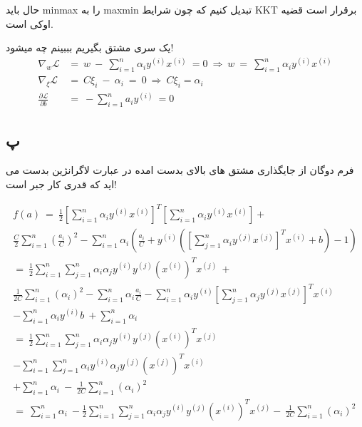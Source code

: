 \documentclass{article}[12pt]
\begin{document}
حال باید minmax را به maxmin تبدیل کنیم که چون شرایط KKT برقرار است قضیه اوکی است.



یک سری مشتق بگیریم بببینم چه میشود!
\begin{equation*}
\begin{split}
\nabla _{w}\mathcal{L} &=\ w\ -\ \sum _{i=1}^{n} \alpha _{i} y^{( i)} x^{( i)} \ =0\ \Rightarrow \ w\ =\ \sum _{i=1}^{n} \alpha _{i} y^{( i)} x^{( i)}\\
\nabla _{\xi }\mathcal{L} \ &=\ C\xi _{i} \ -\ \alpha _{i} \ =\ 0\ \Rightarrow \ C\xi _{i} =\alpha _{i}\\
\frac{\partial \mathcal{L}}{\partial b} &=\ -\sum _{i=1}^{n} a_{i} y^{( i)} \ =0
\end{split}
\end{equation*}
\clearpage
\subsection{پ}
فرم دوگان از جایگذاری
مشتق های بالای بدست امده در 
 عبارت لاگرانژین 
بدست می اید که قدری کار جبر است! 

\begin{gather*}
f( a) \ =\ \frac{1}{2}\left[\sum _{i=1}^{n} \alpha _{i} y^{( i)} x^{( i)}\right]^{T}\left[\sum _{i=1}^{n} \alpha _{i} y^{( i)} x^{( i)}\right] +\\
\frac{C}{2}\sum _{i=1}^{n}\left(\frac{a_{i}}{C}\right)^{2} -\sum _{i=1}^{n} \alpha _{i}\left(\frac{a_{i}}{C} +y^{( i)}\left(\left[\sum _{j=1}^{n} \alpha _{i} y^{( j)} x^{( j)}\right]^{T} x^{( i)} +b\right) -1\right)\\
=\ \frac{1}{2}\sum _{i=1}^{n}\sum _{j=1}^{n} \alpha _{i} \alpha _{j} y^{( i)} y^{( j)}\left( x^{( i)}\right)^{T} x^{( j)} \ +\\
\frac{1}{2C}\sum _{i=1}^{n}( \alpha _{i})^{2} -\sum _{i=1}^{n} \alpha _{i}\frac{a_{i}}{C} -\sum _{i=1}^{n} \alpha _{i} y^{( i)}\left[\sum _{j=1}^{n} \alpha _{j} y^{( j)} x^{( j)}\right]^{T} x^{( i)}\\
-\sum _{i=1}^{n} \alpha _{i} y^{( i)} b\ +\sum _{i=1}^{n} \alpha _{i}\\
=\ \frac{1}{2}\sum _{i=1}^{n}\sum _{j=1}^{n} \alpha _{i} \alpha _{j} y^{( i)} y^{( j)}\left( x^{( i)}\right)^{T} x^{( j)}\\
-\sum _{i=1}^{n}\sum _{j=1}^{n} \alpha _{i} y^{( i)} \alpha _{j} y^{( j)}\left( x^{( j)}\right)^{T} x^{( i)} \ \\
+\sum _{i=1}^{n} \alpha _{i} \ -\ \frac{1}{2C}\sum _{i=1}^{n}( \alpha _{i})^{2}\\
=\ \sum _{i=1}^{n} \alpha _{i} \ -\frac{1}{2}\sum _{i=1}^{n}\sum _{j=1}^{n} \alpha _{i} \alpha _{j} y^{( i)} y^{( j)}\left( x^{( i)}\right)^{T} x^{( j)} -\ \frac{1}{2C}\sum _{i=1}^{n}( \alpha _{i})^{2}
\end{gather*}
\end{document}
